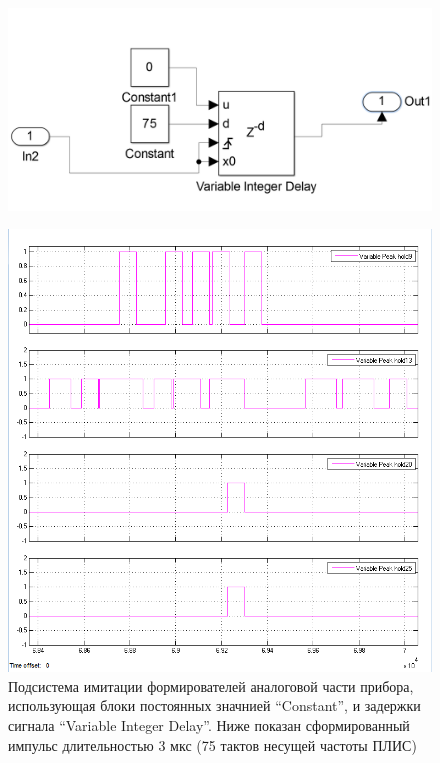 \begin{figure}
	\centering
	\includegraphics[width=0.7\linewidth]{images/sim_form1}
	\caption{}
	\label{fig:sim_form1}
\end{figure}
\begin{figure}
	\centering
	\includegraphics[width=0.7\linewidth]{images/sim_form2}
	\caption[Подсистема имитации формирователей аналоговой части прибора СПЭ]{Подсистема имитации формирователей аналоговой части прибора, использующая блоки постоянных значнией “Constant”, и задержки сигнала “Variable Integer Delay”. Ниже показан сформированный импульс длительностью 3 мкс (75 тактов несущей частоты ПЛИС)}
	\label{fig:sim_form2}
\end{figure}


